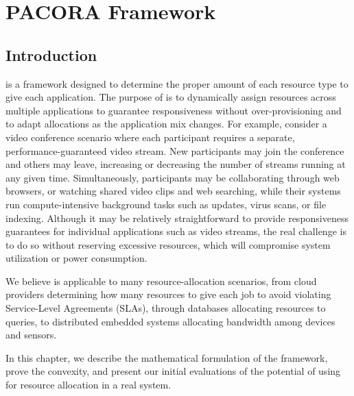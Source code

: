 \chapter{PACORA Framework}
\section{Introduction}
\pacora is a framework designed to determine the proper amount of each
resource type to give each application.  The purpose of \pacora is to dynamically assign resources
across multiple applications to guarantee responsiveness without
over-provisioning and to adapt allocations as the application mix
changes. For example, consider a video conference scenario where each participant requires a separate,
performance-guaranteed video stream.  New participants may join the
conference and others may leave, increasing or decreasing the number
of streams running at any given time.  Simultaneously, participants
may be collaborating through web browsers, or watching shared video
clips and web searching, while their systems run compute-intensive
background tasks such as updates, virus scans, or file indexing.
Although it may be relatively straightforward to provide
responsiveness guarantees for individual applications such as video
streams, the real challenge is to do so without reserving excessive
resources, which will compromise system utilization or power
consumption. 

We believe \pacora is applicable to many resource-allocation
scenarios, from cloud providers determining how many resources to give
each job to avoid violating Service-Level Agreements (SLAs), through databases allocating
resources to queries, to distributed embedded systems allocating
bandwidth among devices and sensors.

 In this chapter, we describe the mathematical formulation of the \pacora framework, prove the convexity, and present our initial evaluations of the potential of using \pacora for resource allocation in a real system.

